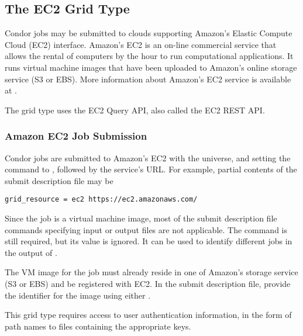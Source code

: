 \subsection{\label{sec:Amazon}The EC2 Grid Type }

Condor jobs may be submitted to clouds supporting
Amazon's Elastic Compute Cloud (EC2) interface.
Amazon's EC2 is an on-line commercial service that allows 
the rental of computers by the hour to run computational applications.
It runs virtual machine images that have been uploaded to Amazon's
online storage service (S3 or EBS).
More information about Amazon's EC2 service is available at
.

The  grid type uses the EC2 Query API,
also called the EC2 REST API.

\subsubsection{\label{sec:Amazon-submit}Amazon EC2 Job Submission}

Condor jobs are submitted to Amazon's EC2
with the  universe, and setting the
 command to , followed 
by the service's URL. For example,
partial contents of the submit description file may be
\begin{verbatim}
grid_resource = ec2 https://ec2.amazonaws.com/
\end{verbatim}

Since the job is a virtual machine image,
most of the submit description file commands
specifying input or output files are not applicable.
The  command is still required,
but its value is ignored. 
It can be used to identify different jobs in the output of .

The VM image for the job must already reside in one of Amazon's storage
service (S3 or EBS) and be registered with EC2.
In the submit description file,
provide the identifier for the image using either .

This grid type requires access to user authentication information,
in the form of path names to files containing the appropriate keys.

